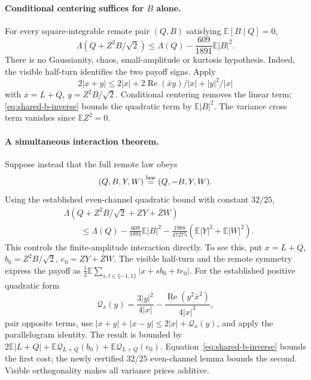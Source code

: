 \paragraph{Conditional centering suffices for $B$ alone.}
For every square-integrable remote pair $(Q,B)$ satisfying
$\mathbb E[B\mid Q]=0$,
\begin{equation}\label{eq:shared-b-centered}
 \boxed{\quad
 \Lambda(Q+Z^2B/\sqrt2)
 \le\Lambda(Q)-\frac{609}{1891}\mathbb E|B|^2.
 \quad}
\end{equation}
There is no Gaussianity, chaos, small-amplitude or kurtosis hypothesis.
Indeed, the visible half-turn identifies the two payoff signs. Apply
\[
 2|x+y|\le2|x|+2\operatorname{Re}(\bar xy)/|x|+|y|^2/|x|
\]
with $x=L+Q$, $y=Z^2B/\sqrt2$. Conditional centering removes the linear
term; \eqref{eq:shared-b-inverse} bounds the quadratic term by
$\mathbb E|B|^2$. The variance cross term vanishes since $\mathbb EZ^2=0$.

\paragraph{A simultaneous interaction theorem.}
Suppose instead that the full remote law obeys
\[
 (Q,B,Y,W)\overset{\rm law}=(Q,-B,Y,W).
\]
Using the established even-channel quadratic bound with constant $32/25$,
\begin{equation}\label{eq:shared-b-even}
 \boxed{\begin{aligned}
 &\Lambda(Q+Z^2B/\sqrt2+ZY+\bar ZW)\\
 &\qquad\le\Lambda(Q)-\frac{609}{1891}\mathbb E|B|^2
       -\frac{1988}{47275}(\mathbb E|Y|^2+\mathbb E|W|^2).
 \end{aligned}}
\end{equation}
This controls the finite-amplitude interaction directly. To see this,
put $x=L+Q$, $b_0=Z^2B/\sqrt2$, $e_0=ZY+\bar ZW$.
The visible half-turn and the remote symmetry express the payoff as
$\frac12\mathbb E\sum_{s,t\in\{-1,1\}}|x+sb_0+te_0|$.
For the established positive quadratic form
\[
 \mathcal Q_x(y)=\frac{3|y|^2}{4|x|}
     -\frac{\operatorname{Re}(y^2\bar x^2)}{4|x|^3},
\]
pair opposite terms, use
$|x+y|+|x-y|\le2|x|+\mathcal Q_x(y)$, and apply the parallelogram
identity. The result is bounded by
$2\mathbb E|L+Q|+\mathbb E\mathcal Q_{L+Q}(b_0)
+\mathbb E\mathcal Q_{L+Q}(e_0)$.
Equation~\eqref{eq:shared-b-inverse} bounds the first cost; the newly certified
$32/25$ even-channel lemma bounds the second. Visible orthogonality makes
all variance prices additive.

